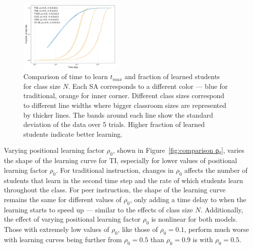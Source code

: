 \documentclass[twocolumn,secnumarabic,amssymb, nobibnotes, aps, prd]{revtex4-2}
\begin{document}
        \begin{figure}[htbp!]
            \centering
            \includegraphics[width=0.45\textwidth]{figures/2D-BPCAIH-analysis/comparison plots/size.png}
            \caption{Comparison of time to learn $t_{max}$ and fraction of learned students for class size $N$.
            Each SA corresponds to a different color --- blue for traditional, orange for inner corner.
            Different class sizes correspond to different line widths where bigger classroom sizes are represented by thicker lines.
            The bands around each line show the standard deviation of the data over 5 trials.
            Higher fraction of learned students indicate better learning.}
            \label{fig:comparison size}
        \end{figure}

        Varying positional learning factor $\rho_0$, shown in Figure~\ref{fig:comparison ρ₀}, varies the shape of the learning curve for TI, especially for lower values of positional learning factor $\rho_0$.
        For traditional instruction, changes in $\rho_0$ affects the number of students that learn in the second time step and the rate of which students learn throughout the class.
        For peer instruction, the shape of the learning curve remains the same for different values of $\rho_0$, only adding a time delay to when the learning starts to speed up --- similar to the effects of class size $N$.
        Additionally, the effect of varying positional learning factor $\rho_0$ is nonlinear for both models. Those with extremely low values of $\rho_0$, like those of $\rho_0=0.1$, perform much worse with learning curves being further from $\rho_0=0.5$ than $\rho_0=0.9$ is with $\rho_0=0.5$.
\end{document}
